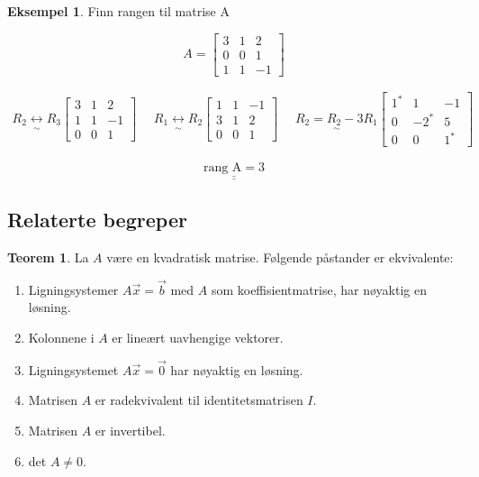 \documentclass[11pt]{article}
\theoremstyle{definition}
\theoremstyle{definition}
\newtheorem{mitteks}{Eksempel}[section]
\theoremstyle{definition}
\theoremstyle{definition}
\newtheorem{teo}{Teorem}[section]
\newenvironment{fteo}
{\begin{mdframed}[style=minstil]\begin{teo}}
		{\end{teo}\end{mdframed}}
\theoremstyle{definition}
\theoremstyle{definition}
\begin{document}
		\begin{mitteks}
			
		Finn rangen til matrise A
		
		\[A=\left[\begin{array}{rrr} 
		3 & 1 & 2 \\
		0 & 0 & 1 \\
		1 & 1 & -1
		\end{array} \right]\]	
		
		\begin{align*}
		\underset{\sim}{R_2\leftrightarrow R_3} 
		\left[\begin{array}{rrr} 
		3 & 1 & 2 \\
		1 & 1 & -1 \\
		0 & 0 & 1
		\end{array} \right]\hspace{16pt}\underset{\sim}{R_1\leftrightarrow R_2}\left[\begin{array}{rrr} 
		1 & 1 & -1 \\
		3 & 1 & 2 \\
		0 & 0 & 1
		\end{array} \right] \hspace{16pt}
		\underset{\sim}{R_2=R_2-3R_1}
		\left[\begin{array}{lcr} 
		1^* & 1 & -1 \\
		0 & -2^* & 5 \\
		0 & 0 & 1^*
		\end{array} \right] 
		\end{align*}
		
		\[\underline{\underline{\text{rang A}=3}}\]
		\end{mitteks}
		
		\subsection{Relaterte begreper}
		
		\begin{fteo}
			La \(A\) være en kvadratisk matrise. Følgende påstander er ekvivalente:
			
			\begin{enumerate}
				\item Ligningsystemer \(A\vec{x}=\vec{b} \) med \(A\) som koeffisientmatrise, har nøyaktig en løsning.
				\item Kolonnene i \(A\) er lineært uavhengige vektorer.
				\item Ligningsystemet \(A\vec{x}=\vec{0} \) har nøyaktig en løsning.
				\item Matrisen \(A\) er radekvivalent til identitetsmatrisen \(I\).
				\item Matrisen \(A\) er invertibel.
				\item det \(A\neq 0 \).
			\end{enumerate}
		\end{fteo}
		
\end{document}
